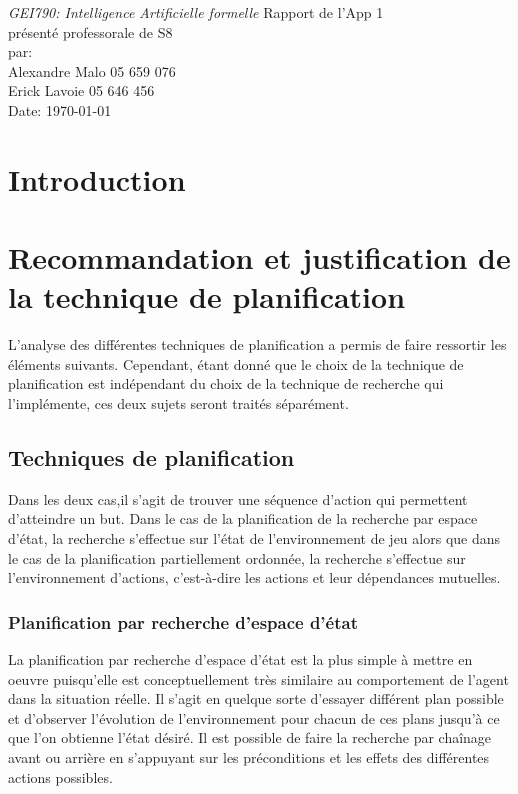\documentclass[12pt,english,frenchb,letterpaper]{article}
\begin{document}
\thispagestyle{empty}
\begin{center}
{\large\em GEI790:  Intelligence Artificielle formelle}
\vfill
Rapport de l'App 1\\
présenté professorale de S8\\
\vfill
par:\\
Alexandre Malo\hspace{2cm} 05 659 076\\
Erick Lavoie\hspace{2cm} 05 646 456\\
\vfill
Date: \today
\end{center}

\newpage
\onehalfspacing


\tableofcontents

\newpage


\section{Introduction}

\section{Recommandation et justification de la technique de planification}
L'analyse des différentes techniques de planification a permis de faire ressortir les éléments suivants.  Cependant, étant donné que le choix de la technique de planification est indépendant du choix de la technique de recherche qui l'implémente, ces deux sujets seront traités séparément.

\subsection{Techniques de planification}
Dans les deux cas,il s'agit de trouver une séquence d'action qui permettent d'atteindre un but. Dans le cas de la planification de la recherche par espace d'état, la recherche s'effectue sur l'état de l'environnement de jeu alors que dans le cas de la planification partiellement ordonnée, la recherche s'effectue sur l'environnement d'actions, c'est-à-dire les actions et leur dépendances mutuelles. 

\subsubsection{Planification par recherche d'espace d'état}

La planification par recherche d'espace d'état est la plus simple à mettre en oeuvre puisqu'elle est conceptuellement très similaire au comportement de l'agent dans la situation réelle.  Il s'agit en quelque sorte d'essayer différent plan possible et d'observer l'évolution de l'environnement pour chacun de ces plans jusqu'à ce que l'on obtienne l'état désiré.  Il est possible de faire la recherche par chaînage avant ou arrière en s'appuyant sur les préconditions et les effets des différentes actions possibles.
\end{document}

